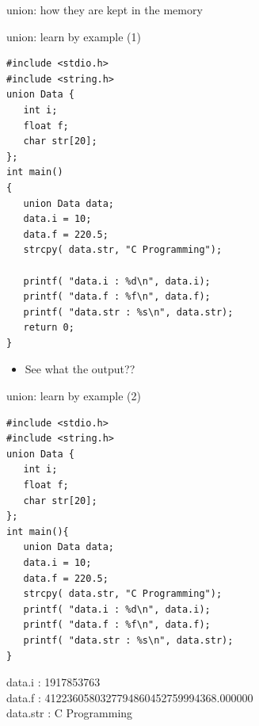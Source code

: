 \begin{frame}[fragile]{union: how they are kept in the memory}
\begin{figure}
	\hspace{0.15in}
\end{figure}
\end{frame}

\begin{frame}[fragile]{union: learn by example (1)}
\begin{lstlisting}
#include <stdio.h>
#include <string.h>
union Data {
   int i;
   float f;
   char str[20];
};
int main() 
{
   union Data data;        
   data.i = 10;
   data.f = 220.5;
   strcpy( data.str, "C Programming");

   printf( "data.i : %d\n", data.i);
   printf( "data.f : %f\n", data.f);
   printf( "data.str : %s\n", data.str);
   return 0;
}
\end{lstlisting}
\begin{itemize}
	\item {See what the output??}
\end{itemize}
\end{frame}

\begin{frame}[fragile]{union: learn by example (2)}
\vspace{-0.2in}
\begin{lstlisting}
#include <stdio.h>
#include <string.h>
union Data {
   int i;
   float f;
   char str[20];
};
int main(){
   union Data data;        
   data.i = 10;
   data.f = 220.5;
   strcpy( data.str, "C Programming");
   printf( "data.i : %d\n", data.i);
   printf( "data.f : %f\n", data.f);
   printf( "data.str : %s\n", data.str);
}
\end{lstlisting}
\vspace{-0.20in}
data.i : 1917853763\\
data.f : 4122360580327794860452759994368.000000\\
data.str : C Programming
\end{frame}

